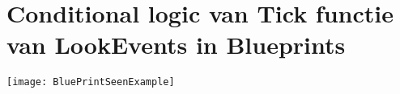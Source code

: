 \chapter{Conditional logic van Tick functie van LookEvents in Blueprints}

\texttt{[image: BluePrintSeenExample]}